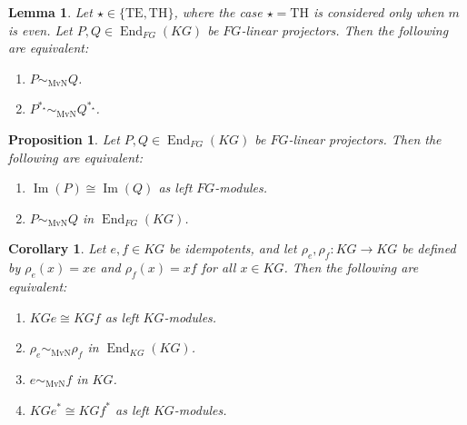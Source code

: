 \documentclass[10pt,a4paper]{amsart}
\newtheorem{lemma}{Lemma}
\newtheorem{proposition}{Proposition}
\newtheorem{corollary}{Corollary}
\begin{document}
\begin{lemma}\label{lem:adjoint-neu}
Let $\star\in\{\mathrm{TE},\mathrm{TH}\}$, where the case $\star=\mathrm{TH}$ is considered only when $m$ is even. Let $P,Q\in \operatorname{End}_{FG}(KG)$ be $FG$-linear projectors. Then the following are equivalent:
\begin{enumerate}
    \item $P\sim_{\mathrm{MvN}}Q$.
    \item $P^{\ast_\star}\sim_{\mathrm{MvN}}Q^{\ast_\star}$.
\end{enumerate}
\end{lemma}

\begin{proposition}\label{prop:equivalent-projectors}
Let $P,Q\in \operatorname{End}_{FG}(KG)$ be $FG$-linear projectors. Then the following are equivalent:
\begin{enumerate}
    \item $\operatorname{Im}(P)\cong \operatorname{Im}(Q)$ as left $FG$-modules.
    \item $P\sim_{\mathrm{MvN}}Q$ in $\operatorname{End}_{FG}(KG)$.
\end{enumerate}
\end{proposition}

\begin{corollary}\label{cor:idempotent-neu}
Let $e,f\in KG$ be idempotents, and let $\rho_e,\rho_f:KG\longrightarrow KG$ be defined by $\rho_e(x)=xe$ and $\rho_f(x)=xf$ for all $x\in KG$. Then the following are equivalent:
\begin{enumerate}
    \item $KGe\cong KGf$ as left $KG$-modules.
    \item $\rho_e\sim_{\mathrm{MvN}}\rho_f$ in $\operatorname{End}_{KG}(KG)$.
    \item $e\sim_{\mathrm{MvN}}f$ in $KG$.
    \item $KGe^\ast\cong KGf^\ast$ as left $KG$-modules.
\end{enumerate}
\end{corollary}
\end{document}
